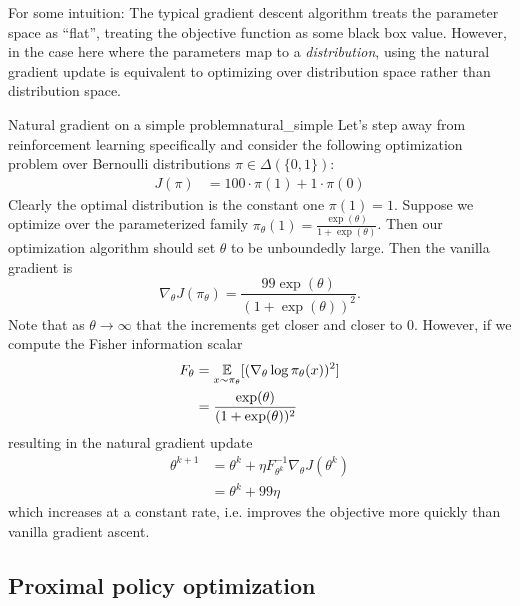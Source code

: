 \documentclass[\main/main]{subfiles}
\begin{document}

For some intuition: The typical gradient descent algorithm treats the parameter space as ``flat'', treating the objective function as some black box value. However, in the case here where the parameters map to a \emph{distribution}, using the natural gradient update is equivalent to optimizing over distribution space rather than distribution space.

\begin{example}{Natural gradient on a simple problem}{natural_simple}
    Let's step away from reinforcement learning specifically and consider the following optimization problem over Bernoulli distributions $\pi \in \Delta(\{ 0, 1 \})$:
    \begin{align*}
        J(\pi) & = 100 \cdot \pi(1) + 1 \cdot \pi(0)
    \end{align*}
    Clearly the optimal distribution is the constant one $\pi(1) = 1$.
    Suppose we optimize over the parameterized family $\pi_\theta(1) = \frac{\exp(\theta)}{1+\exp(\theta)}$. Then our optimization algorithm should set $\theta$ to be unboundedly large.
    Then the vanilla gradient is
    \[
        \nabla_\theta J(\pi_\theta) = \frac{99 \exp(\theta)}{(1 + \exp(\theta))^2}.
    \]
    Note that as $\theta \to \infty$ that the increments get closer and closer to $0$.
    However, if we compute the Fisher information scalar
    \begin{align*}
        F_\theta & = \operatorname*{\mathbb{E}}_{x \sim \pi_\theta} [ (\nabla_\theta \log \pi_\theta(x))^2 ] \\
                 & = \frac{\exp(\theta)}{(1 + \exp(\theta))^2}
    \end{align*}
    resulting in the natural gradient update
    \begin{align*}
        \theta^{k+1} & = \theta^k + \eta F_{\theta^k}^{-1} \nabla_ \theta J(\theta^k) \\
                     & = \theta^k + 99 \eta
    \end{align*}
    which increases at a constant rate, i.e. improves the objective more quickly than vanilla gradient ascent.
\end{example}

\subsection{Proximal policy optimization}
\end{document}
